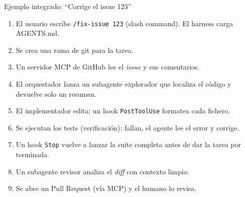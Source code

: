 \begin{frame}{Ejemplo integrado: ``Corrige el issue 123''}
\begin{enumerate}
    \item El usuario escribe \texttt{/fix-issue 123} (\alert{slash command}). El harness carga \alert{AGENTS.md}.
    \item Se crea una rama de git para la tarea.
    \item Un servidor \alert{MCP} de GitHub lee el \textit{issue} y sus comentarios.
    \item El \alert{orquestador} lanza un \alert{subagente explorador} que localiza el código y devuelve solo un resumen.
    \item El implementador edita; un \alert{hook} \texttt{PostToolUse} formatea cada fichero.
    \item Se ejecutan los \alert{tests} (verificación): fallan, el agente lee el error y corrige.
    \item Un \alert{hook} \texttt{Stop} vuelve a lanzar la suite completa antes de dar la tarea por terminada.
    \item Un \alert{subagente revisor} analiza el \textit{diff} con contexto limpio.
    \item Se abre un Pull Request (vía MCP) y el \alert{humano} lo revisa.
\end{enumerate}
\end{frame}
 
